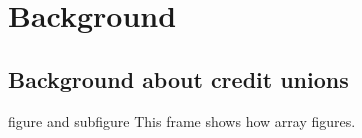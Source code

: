 \documentclass[notes,11pt, aspectratio=169]{beamer}
\begin{document}



\section{Background}

\subsection*{Background about credit unions}


\begin{frame}{figure and subfigure}
This frame shows how array figures.
\end{frame}
\end{document}
